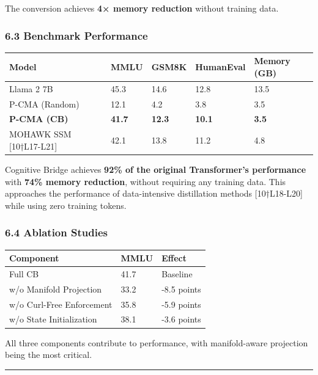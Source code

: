 \documentclass[
  11pt,
  a4paper,
]{article}
\begin{document}
The conversion achieves \textbf{4× memory reduction} without training
data.

\subsubsection{6.3 Benchmark Performance}\label{benchmark-performance}

\begin{longtable}[]{@{}lllll@{}}
\toprule\noalign{}
Model & MMLU & GSM8K & HumanEval & Memory (GB) \\
\midrule\noalign{}
\endhead
\bottomrule\noalign{}
\endlastfoot
Llama 2 7B & 45.3 & 14.6 & 12.8 & 13.5 \\
P-CMA (Random) & 12.1 & 4.2 & 3.8 & 3.5 \\
\textbf{P-CMA (CB)} & \textbf{41.7} & \textbf{12.3} & \textbf{10.1} &
\textbf{3.5} \\
MOHAWK SSM {[}10†L17-L21{]} & 42.1 & 13.8 & 11.2 & 4.8 \\
\end{longtable}

Cognitive Bridge achieves \textbf{92\% of the original Transformer's
performance} with \textbf{74\% memory reduction}, without requiring any
training data. This approaches the performance of data-intensive
distillation methods {[}10†L18-L20{]} while using zero training tokens.

\subsubsection{6.4 Ablation Studies}\label{ablation-studies}

\begin{longtable}[]{@{}lll@{}}
\toprule\noalign{}
Component & MMLU & Effect \\
\midrule\noalign{}
\endhead
\bottomrule\noalign{}
\endlastfoot
Full CB & 41.7 & Baseline \\
w/o Manifold Projection & 33.2 & -8.5 points \\
w/o Curl-Free Enforcement & 35.8 & -5.9 points \\
w/o State Initialization & 38.1 & -3.6 points \\
\end{longtable}

All three components contribute to performance, with manifold-aware
projection being the most critical.

\begin{center}\rule{0.5\linewidth}{0.5pt}\end{center}
\end{document}
